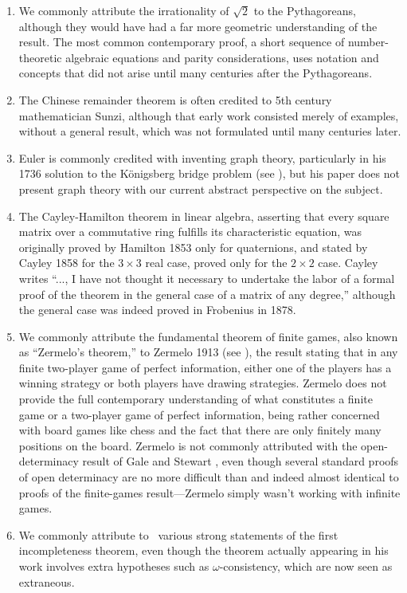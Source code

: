 \documentclass[12pt]{amsart}
\begin{document}
\begin{enumerate}
\item We commonly attribute the irrationality of $\sqrt{2}$ to the Pythagoreans, although they would have had a far more geometric understanding of the result. The most common contemporary proof, a short sequence of number-theoretic algebraic equations and parity considerations, uses notation and concepts that did not arise until many centuries after the Pythagoreans.

\item The Chinese remainder theorem is often credited to 5th century mathematician Sunzi, although that early work consisted merely of examples, without a general result, which was not formulated until many centuries later. 

\item Euler is commonly credited with inventing graph theory, particularly in his 1736 solution to the K\"onigsberg bridge problem (see \cite{BiggsLloydWilson1986:Graph-theory-1736-1936}), but his paper does not present graph theory with our current abstract perspective on the subject. 

\item The Cayley-Hamilton theorem in linear algebra, asserting that every square matrix over a commutative ring fulfills its characteristic equation, was originally proved by Hamilton 1853 only for quaternions, and stated by Cayley 1858 for the $3\times 3$ real case, proved only for the $2\times 2$ case. Cayley \cite{Cayley1858:A-memoir-on-the-theory-of-matrices} writes “..., I have not thought it necessary to undertake the labor of a formal proof of the theorem in the general case of a matrix of any degree,” although the general case was indeed proved in Frobenius in 1878. 

\item We commonly attribute the fundamental theorem of finite games, also known as ``Zermelo's theorem,'' to Zermelo 1913 (see \cite{Larson2010:Zermelo-1913}), the result stating that in any finite two-player game of perfect information, either one of the players has a winning strategy or both players have drawing strategies. Zermelo does not provide the full contemporary understanding of what constitutes a finite game or a two-player game of perfect information, being rather concerned with board games like chess and the fact that there are only finitely many positions on the board. Zermelo is not commonly attributed with the open-determinacy result of Gale and Stewart \cite{GaleStewart1953:InfiniteGamesWithPerfectInformation}, even though several standard proofs of open determinacy are no more difficult than and indeed almost identical to proofs of the finite-games result---Zermelo simply wasn't working with infinite games. 

\item We commonly attribute to \Godel\ various strong statements of the first incompleteness theorem, even though the theorem actually appearing in his work involves extra hypotheses such as $\omega$-consistency, which are now seen as extraneous.

\end{enumerate}
\end{document}
